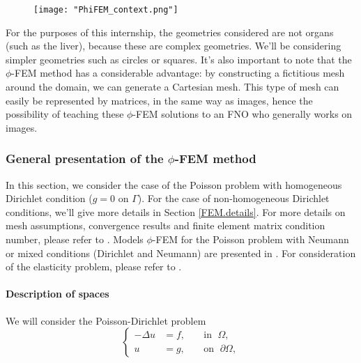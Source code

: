 \begin{figure}[H]
	\centering
	\texttt{[image: "PhiFEM\_context.png"]}
	\label{context}
\end{figure}

\begin{Rem}
	For the purposes of this internship, the geometries considered are not organs (such as the liver), because these are complex geometries. We'll be considering simpler geometries such as circles or squares. It's also important to note that the $\phi$-FEM method has a considerable advantage: by constructing a fictitious mesh around the domain, we can generate a Cartesian mesh. This type of mesh can easily be represented by matrices, in the same way as images, hence the possibility of teaching these $\phi$-FEM solutions to an FNO who generally works on images. 
\end{Rem}

\subsubsection{General presentation of the $\phi$-FEM method}

In this section, we consider the case of the Poisson problem with homogeneous Dirichlet condition ($g=0$ on $\Gamma$). For the case of non-homogeneous Dirichlet conditions, we'll give more details in Section \ref{FEM.details}. For more details on mesh assumptions, convergence results and finite element matrix condition number, please refer to . Models $\phi$-FEM for the Poisson problem with Neumann or mixed conditions (Dirichlet and Neumann) are presented in . For consideration of the elasticity problem, please refer to .

\paragraph{Description of spaces} 


We will consider the Poisson-Dirichlet problem
\begin{equation*}
	\left\{
	\begin{aligned}
		-\Delta u &= f, \; &&\text{in } \; \Omega, \\
		u&=g, \; &&\text{on } \; \partial\Omega,
	\end{aligned}
	\right.
\end{equation*}

